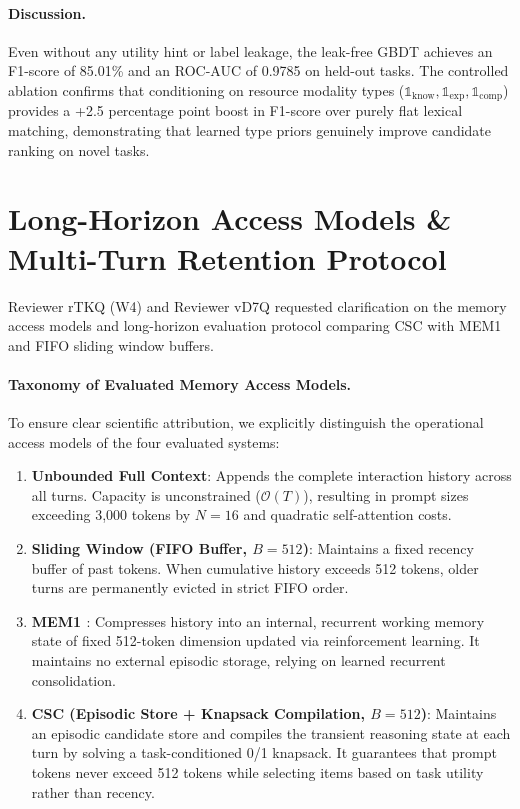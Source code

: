 \documentclass{article}
\begin{document}
\paragraph{Discussion.} Even without any utility hint or label leakage, the leak-free GBDT achieves an F1-score of 85.01\% and an ROC-AUC of 0.9785 on held-out tasks. The controlled ablation confirms that conditioning on resource modality types ($\mathbb{1}_{\text{know}}, \mathbb{1}_{\text{exp}}, \mathbb{1}_{\text{comp}}$) provides a +2.5 percentage point boost in F1-score over purely flat lexical matching, demonstrating that learned type priors genuinely improve candidate ranking on novel tasks.

\section{Long-Horizon Access Models \& Multi-Turn Retention Protocol}
\label{app:long_horizon}

Reviewer rTKQ (W4) and Reviewer vD7Q requested clarification on the memory access models and long-horizon evaluation protocol comparing CSC with MEM1 \citep{zhou2025mem1} and FIFO sliding window buffers.

\paragraph{Taxonomy of Evaluated Memory Access Models.} To ensure clear scientific attribution, we explicitly distinguish the operational access models of the four evaluated systems:
\begin{enumerate}
    \item \textbf{Unbounded Full Context}: Appends the complete interaction history across all turns. Capacity is unconstrained ($\mathcal{O}(T)$), resulting in prompt sizes exceeding 3,000 tokens by $N=16$ and quadratic self-attention costs.
    \item \textbf{Sliding Window (FIFO Buffer, $B=512$)}: Maintains a fixed recency buffer of past tokens. When cumulative history exceeds 512 tokens, older turns are permanently evicted in strict FIFO order.
    \item \textbf{MEM1 \citep{zhou2025mem1}}: Compresses history into an internal, recurrent working memory state of fixed 512-token dimension updated via reinforcement learning. It maintains no external episodic storage, relying on learned recurrent consolidation.
    \item \textbf{CSC (Episodic Store + Knapsack Compilation, $B=512$)}: Maintains an episodic candidate store and compiles the transient reasoning state at each turn by solving a task-conditioned 0/1 knapsack. It guarantees that prompt tokens never exceed 512 tokens while selecting items based on task utility rather than recency.
\end{enumerate}
\end{document}

